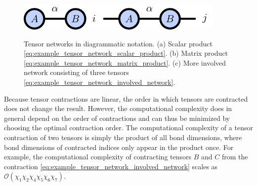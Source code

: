 \begin{figure}[ht]
	\centering
	\subcaptionbox{\label{fig:basic_tensor_networks_matrix_vector_product}}
	{%
		\raisebox{\dimexpr.5\ht\largestimage-.5\height}
		{%
			\includegraphics[scale=1]{figures/tikz/Tensor_Networks/basic_networks/basic_networks_a.pdf}
		}
	}
	\subcaptionbox{\label{fig:basic_tensor_networks_matrix_product}}
	{%
		\raisebox{\dimexpr.5\ht\largestimage-.5\height}
		{%
			\includegraphics[scale=1]{figures/tikz/Tensor_Networks/basic_networks/basic_networks_b.pdf}
		}
	}
	\subcaptionbox{\label{fig:basic_tensor_networks_involved_contraction}}
	{%
		\usebox{\largestimage}
	}
	\caption{Tensor networks in diagrammatic notation. (a) Scalar product \eqref{eq:example_tensor_network_scalar_product}. (b) Matrix product \eqref{eq:example_tensor_network_matrix_product}. (c) More involved network consisting of three tensors \eqref{eq:example_tensor_network_involved_network}.}
	\label{fig:basic_tensor_network_diagrams}
\end{figure}
Because tensor contractions are linear, the order in which tensors are contracted does not change the result. However, the computational complexity does in general depend on the order of contractions and can thus be minimized by choosing the optimal contraction order. The computational complexity of a tensor contraction of two tensors is simply the product of all bond dimensions, where bond dimensions of contracted indices only appear in the product once. For example, the computational complexity of contracting tensors $B$ and $C$ from the contraction \eqref{eq:example_tensor_network_involved_network} scales as $\mathcal{O}(\chi_1\chi_2\chi_4\chi_5\chi_6\chi_7)$. \par
